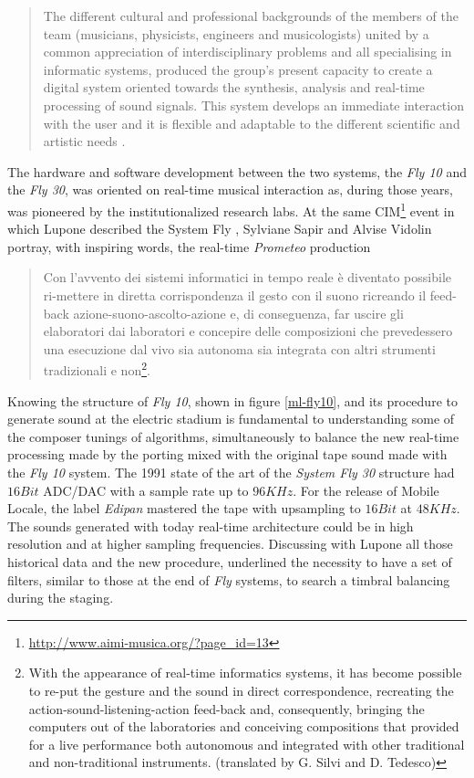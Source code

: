 \documentclass[twoside,a4paper]{article}
\begin{document}

\begin{quote}
The different cultural and professional backgrounds of the members of the team
(musicians, physicists, engineers and musicologists) united by a common
appreciation of interdisciplinary problems and all specialising in informatic
systems, produced the group's present capacity to create a digital system
oriented towards the synthesis, analysis and real-time processing of sound
signals. This system develops an immediate interaction with the user and it is
flexible and adaptable to the different scientific and artistic needs \cite{ml91}.
\end{quote}

The hardware and software development between the two systems, the \emph{Fly 10}
and the \emph{Fly 30}, was oriented on real-time musical interaction as, during
those years, was pioneered by the institutionalized research labs. At the same
CIM\footnote{\url{http://www.aimi-musica.org/?page_id=13}} event in which Lupone
described the System Fly \cite{ml85},  Sylviane Sapir and Alvise Vidolin
\cite{savi85} portray, with inspiring words, the real-time \emph{Prometeo}
production

\begin{quote}
Con l'avvento dei sistemi informatici in tempo reale è diventato possibile
ri-mettere in diretta corrispondenza il gesto con il suono ricreando il feed-back
azione-suono-ascolto-azione e, di conseguenza, far uscire gli elaboratori dai
laboratori e concepire delle composizioni che prevedessero una esecuzione dal
vivo sia autonoma sia integrata con altri strumenti tradizionali e
non\footnote{With the appearance of real-time informatics systems, it has become
possible to re-put the gesture and the sound in direct correspondence, recreating
the action-sound-listening-action feed-back and, consequently, bringing the
computers out of the laboratories and conceiving compositions that provided for a
live performance both autonomous and integrated with other traditional and
non-traditional instruments. (translated by G. Silvi and D. Tedesco)}.
\end{quote}

Knowing the structure of \emph{Fly 10}, shown in figure \ref{ml-fly10}, and its
procedure to generate sound at the electric stadium is fundamental to understanding
some of the composer tunings of algorithms,  simultaneously to balance the new
real-time processing made by the porting mixed with the original tape sound made
with the \emph{Fly 10} system. The 1991 state of the art of the \emph{System Fly
30} structure had $16Bit$ ADC/DAC with a sample rate up to $96KHz$. For the
release of Mobile Locale, the label \emph{Edipan} mastered the tape with upsampling
to $16Bit$ at $48KHz$. The sounds generated with today real-time architecture
could be in high resolution and at higher sampling frequencies. Discussing with
Lupone all those historical data and the new procedure, underlined the necessity
to have a set of filters, similar to those at the end of \emph{Fly} systems, to
search a timbral balancing during the staging.
\end{document}
